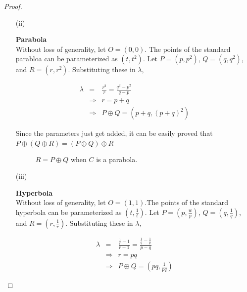 \begin{proof}
\begin{itemize}
{        $$\Longrightarrow R=P\oplus Q=(r_1,r_2)=(p_1q_1-p_2q_2,p_1q_2+p_2q_1)$$

        Using this formula, it can be proved that $(P\oplus Q)\oplus R=P\oplus(Q\oplus R)$.
      }
    \item[(ii)]{
        \textbf{Parabola}\\
        Without loss of generality, let $O=(0,0)$. The points of the standard parabloa can
        be parameterized as $(t,t^2)$. Let $P=(p,p^2)$, $Q=(q,q^2)$, and $R=(r,r^2)$.
        Substituting these in $\lambda$,

        \begin{eqnarray*}
          \lambda&=& \frac{r^2}{r}=\frac{q^2-p^2}{q-p}\\
          &\Longrightarrow& r=p+q \\
          &\Longrightarrow& P\oplus Q=(p+q,(p+q)^2)
        \end{eqnarray*}
  
        Since the parameters just get added, it can be easily proved that\\
        $P\oplus(Q\oplus R)=(P\oplus Q)\oplus R$
 
        \begin{figure}[H]
          \center
          \caption{$R = P \oplus Q$ when $C$ is a parabola.}
        \end{figure}
      }
    \item[(iii)]{
        \textbf{Hyperbola}\\
        Without loss of generality, let $O=(1,1)$.The points of the standard hyperbola can
        be parameterized as $(t,\frac{1}{t})$. Let $P=(p,\frac{w}{p})$, $Q=(q,\frac{1}{q})$,
        and $R=(r,\frac{1}{r})$. Substituting these in $\lambda$,

        \begin{eqnarray*}
          \lambda&=& \frac{\frac{1}{r}-1}{r-1}=\frac{\frac{1}{q}-\frac{1}{p}}{p-q}\\
          &\Longrightarrow& r=pq\\
          &\Longrightarrow& P\oplus Q=(pq,\frac{1}{pq})
        \end{eqnarray*}

}
\end{itemize}
\end{proof}

